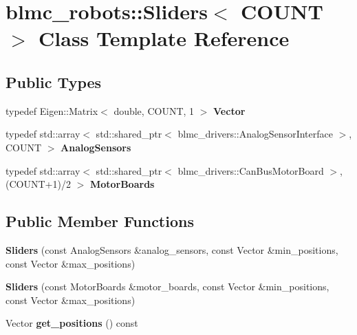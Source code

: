\hypertarget{classblmc__robots_1_1Sliders}{}\section{blmc\+\_\+robots\+:\+:Sliders$<$ C\+O\+U\+NT $>$ Class Template Reference}
\label{classblmc__robots_1_1Sliders}
\subsection*{Public Types}
\begin{DoxyCompactItemize}
\item 
\mbox{\label{classblmc__robots_1_1Sliders_a40f558e5970d0a1f5817dbd18d162733}} 
typedef Eigen\+::\+Matrix$<$ double, C\+O\+U\+NT, 1 $>$ {\bfseries Vector}
\item 
\mbox{\label{classblmc__robots_1_1Sliders_aa529cb0d46f753f32db90900d36fd288}} 
typedef std\+::array$<$ std\+::shared\+\_\+ptr$<$ blmc\+\_\+drivers\+::\+Analog\+Sensor\+Interface $>$, C\+O\+U\+NT $>$ {\bfseries Analog\+Sensors}
\item 
\mbox{\label{classblmc__robots_1_1Sliders_a13624e9fdf4bbb6c62d1ec01c27e2022}} 
typedef std\+::array$<$ std\+::shared\+\_\+ptr$<$ blmc\+\_\+drivers\+::\+Can\+Bus\+Motor\+Board $>$,(C\+O\+U\+NT+1)/2 $>$ {\bfseries Motor\+Boards}
\end{DoxyCompactItemize}
\subsection*{Public Member Functions}
\begin{DoxyCompactItemize}
\item 
\mbox{\label{classblmc__robots_1_1Sliders_ae957034a00de8edc19320a608e4cf997}} 
{\bfseries Sliders} (const Analog\+Sensors \&analog\+\_\+sensors, const Vector \&min\+\_\+positions, const Vector \&max\+\_\+positions)
\item 
\mbox{\label{classblmc__robots_1_1Sliders_aeb72e8d249a9d1b419e47a1327602672}} 
{\bfseries Sliders} (const Motor\+Boards \&motor\+\_\+boards, const Vector \&min\+\_\+positions, const Vector \&max\+\_\+positions)
\item 
\mbox{\label{classblmc__robots_1_1Sliders_a7b0a3e8ca6c5496546f7bf61dc0573f4}} 
Vector {\bfseries get\+\_\+positions} () const
\end{DoxyCompactItemize}
